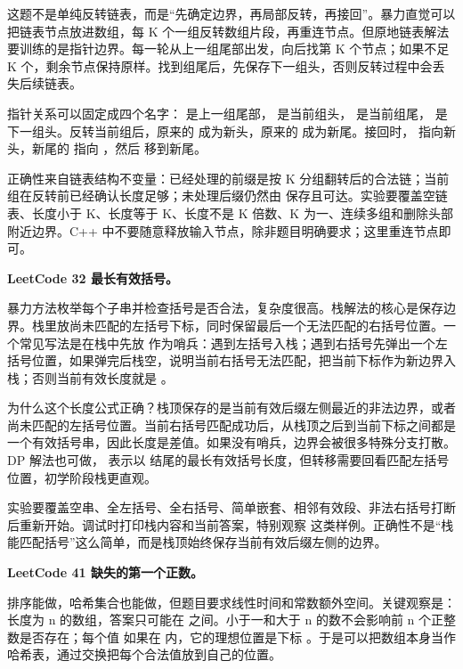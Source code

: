 这题不是单纯反转链表，而是“先确定边界，再局部反转，再接回”。暴力直觉可以把链表节点放进数组，每 K 个一组反转数组片段，再重连节点。但原地链表解法要训练的是指针边界。每一轮从上一组尾部出发，向后找第 K 个节点；如果不足 K 个，剩余节点保持原样。找到组尾后，先保存下一组头，否则反转过程中会丢失后续链表。

指针关系可以固定成四个名字： 是上一组尾部， 是当前组头， 是当前组尾， 是下一组头。反转当前组后，原来的  成为新头，原来的  成为新尾。接回时， 指向新头，新尾的  指向 ，然后  移到新尾。

正确性来自链表结构不变量：已经处理的前缀是按 K 分组翻转后的合法链；当前组在反转前已经确认长度足够；未处理后缀仍然由  保存且可达。实验要覆盖空链表、长度小于 K、长度等于 K、长度不是 K 倍数、K 为一、连续多组和删除头部附近边界。C++ 中不要随意释放输入节点，除非题目明确要求；这里重连节点即可。

\noindent\textbf{LeetCode 32 最长有效括号。}

暴力方法枚举每个子串并检查括号是否合法，复杂度很高。栈解法的核心是保存边界。栈里放尚未匹配的左括号下标，同时保留最后一个无法匹配的右括号位置。一个常见写法是在栈中先放  作为哨兵：遇到左括号入栈；遇到右括号先弹出一个左括号位置，如果弹完后栈空，说明当前右括号无法匹配，把当前下标作为新边界入栈；否则当前有效长度就是 。

为什么这个长度公式正确？栈顶保存的是当前有效后缀左侧最近的非法边界，或者尚未匹配的左括号位置。当前右括号匹配成功后，从栈顶之后到当前下标之间都是一个有效括号串，因此长度是差值。如果没有哨兵，边界会被很多特殊分支打散。DP 解法也可做， 表示以  结尾的最长有效括号长度，但转移需要回看匹配左括号位置，初学阶段栈更直观。

实验要覆盖空串、全左括号、全右括号、简单嵌套、相邻有效段、非法右括号打断后重新开始。调试时打印栈内容和当前答案，特别观察 \code{)()())} 这类样例。正确性不是“栈能匹配括号”这么简单，而是栈顶始终保存当前有效后缀左侧的边界。

\noindent\textbf{LeetCode 41 缺失的第一个正数。}

排序能做，哈希集合也能做，但题目要求线性时间和常数额外空间。关键观察是：长度为 n 的数组，答案只可能在  之间。小于一和大于 n 的数不会影响前 n 个正整数是否存在；每个值  如果在  内，它的理想位置是下标 。于是可以把数组本身当作哈希表，通过交换把每个合法值放到自己的位置。

